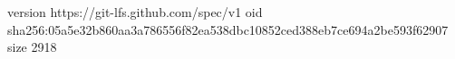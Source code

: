 version https://git-lfs.github.com/spec/v1
oid sha256:05a5e32b860aa3a786556f82ea538dbc10852ced388eb7ce694a2be593f62907
size 2918
